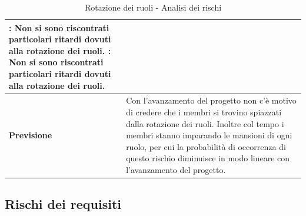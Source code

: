 \documentclass[12pt,a4paper]{article}
\begin{document}
\begin{table}[H]
\begin{center}
\begin{tabular}{p{} p{}}
                \textbf{\FPA{}}: Non si sono riscontrati particolari ritardi dovuti alla rotazione dei ruoli. \newline
                \textbf{\FPD{}}: Non si sono riscontrati particolari ritardi dovuti alla rotazione dei ruoli. \\
            \midrule
            \textbf{Previsione} & Con l'avanzamento del progetto non c'è motivo di credere che i membri si trovino spiazzati dalla rotazione dei ruoli. Inoltre col tempo i membri stanno imparando le mansioni di ogni ruolo, per cui la probabilità di occorrenza di questo rischio diminuisce in modo lineare con l'avanzamento del progetto. \\
			\bottomrule
		\end{tabular}
		\caption{Rotazione dei ruoli - Analisi dei rischi}
	\end{center}
\end{table}

\subsection{Rischi dei requisiti}
\end{document}
